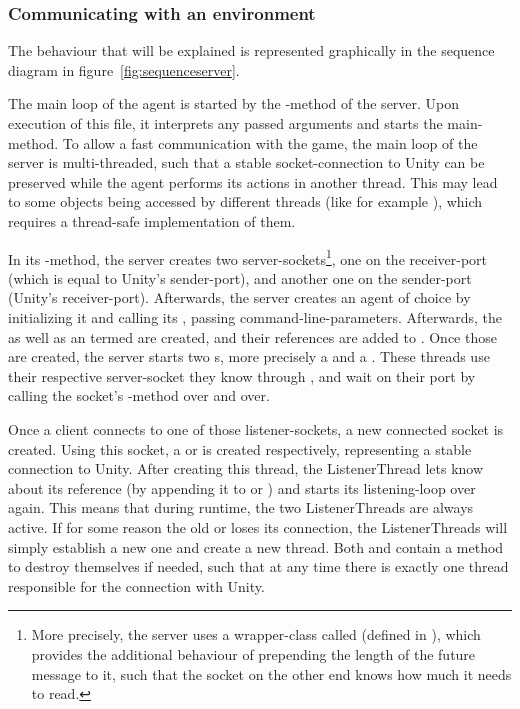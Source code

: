 \subsubsection{Communicating with an environment}

The behaviour that will be explained is represented graphically in the sequence diagram in figure~\ref{fig:sequenceserver}. 

The main loop of the agent is started by the -method of the server. Upon execution of this file, it interprets any passed arguments and starts the main-method. %
To allow a fast communication with the game, the main loop of the server is multi-threaded, such that a stable socket-connection to Unity can be preserved while the agent performs its actions in another thread. This may lead to some objects being accessed by different threads (like for example ), which requires a thread-safe implementation of them.

In its -method, the server creates two server-sockets\footnote{More precisely, the server uses a wrapper-class called  (defined in ), which provides the additional behaviour of prepending the length of the future message to it, such that the socket on the other end knows how much it needs to read.}, one on the receiver-port (which is equal to Unity's sender-port), and another one on the sender-port (Unity's receiver-port). Afterwards, the server creates an agent of choice by initializing it and calling its , passing command-line-parameters. Afterwards, the   as well as an  termed  are created, and their references are added to . Once those are created, the server starts two s, more precisely a  and a . These threads use their respective server-socket they know through , and wait on their port by calling the socket's -method over and over.

Once a client connects to one of those listener-sockets, a new connected socket is created. Using this socket, a  or  is created respectively, representing a stable connection to Unity. After creating this thread, the ListenerThread lets  know about its reference (by appending it to  or ) and starts its listening-loop over again. This means that during runtime, the two ListenerThreads are always active. If for some reason the old  or  loses its connection, the ListenerThreads will simply establish a new one and create a new thread. Both  and   contain a method to destroy themselves if needed, such that at any time there is exactly one thread responsible for the connection with Unity.


